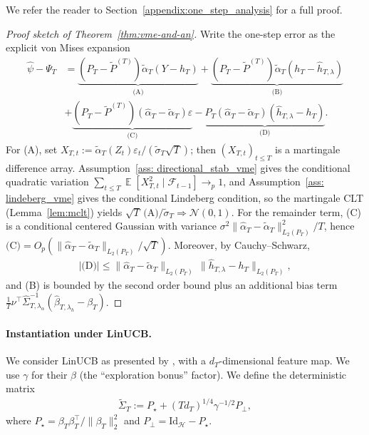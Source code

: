 \documentclass[11pt]{article}
\DeclareMathOperator{\E}{\mathbb{E}}
\begin{document}
We refer the reader to Section~\ref{appendix:one_step_analysis} for a full proof.
\begin{proof}[Proof sketch of Theorem~\ref{thm:vme-and-an}]
Write the one-step error as the explicit von Mises expansion
\begin{align*}
    \widehat\psi-\Psi_T
&=\underbrace{(P_T-\widetilde P^{(T)})\widetilde\alpha_T(Y-h_T)}_{\text{(A)}}
+\underbrace{(P_T-\widetilde P^{(T)})\widetilde\alpha_T(h_T-\widehat h_{T,\lambda})}_{\text{(B)}}\\
&+\underbrace{(P_T-\widetilde P^{(T)})(\widehat\alpha_T-\widetilde\alpha_T)\varepsilon}_{\text{(C)}}
-\underbrace{P_T(\widehat\alpha_T-\widetilde\alpha_T)(\widehat h_{T,\lambda}-h_T)}_{\text{(D)}}.
\end{align*}
For (A), set $X_{T,t}:=\widetilde\alpha_T(Z_t)\varepsilon_t/(\widetilde\sigma_T\sqrt T)$; then $(X_{T,t})_{t\le T}$ is a martingale difference array.
Assumption~\ref{ass: directional_stab_vme} gives the conditional quadratic variation
$\sum_{t\le T}\E[X_{T,t}^2\mid \mathcal F_{t-1}]\to_p 1$, and Assumption~\ref{ass: lindeberg_vme} gives the conditional Lindeberg condition, so the martingale CLT (Lemma~\ref{lem:mclt}) yields
$\sqrt T\,\text{(A)}/\widetilde\sigma_T\Rightarrow \mathcal N(0,1)$.
For the remainder term, (C) is a conditional centered Gaussian with variance
$\sigma^2\|\widehat\alpha_T-\widetilde\alpha_T\|_{L_2(P_T)}^2/T$, hence
$\text{(C)}=O_p(\|\widehat\alpha_T-\widetilde\alpha_T\|_{L_2(P_T)}/\sqrt T)$.
Moreover, by Cauchy--Schwarz,
\begin{align*}
    |\text{(D)}|\le \|\widehat\alpha_T-\widetilde\alpha_T\|_{L_2(P_T)}\,
\|\widehat h_{T,\lambda}-h_T\|_{L_2(P_T)}, 
\end{align*}
and (B) is bounded by the second order bound plus an additional bias term $\frac{1}{T} \nu^\top \widehat \Sigma_{T,\lambda_\alpha}^{-1} (\widehat{\beta}_{T,\lambda_h} - \beta_T)$.

\end{proof}
\paragraph{Instantiation under LinUCB.}
We consider LinUCB as presented by \citet[Chapter 19]{lattimore2020}, with a $d_T$-dimensional feature map. We use $\gamma$ for their $\beta$ (the ``exploration bonus'' factor). We define the deterministic matrix
\begin{align*}
    \widetilde \Sigma_T := P_\star + (T d_T)^{1/4} \gamma^{-1/2} P_\perp, 
\end{align*}
where $P_\star = \beta_T \beta_T^{\top}/ \|\beta_T\|_2^2$ and $P_{\perp} = \mathrm{Id}_{\mathcal{H}} - P_{\star}$.
\end{document}

